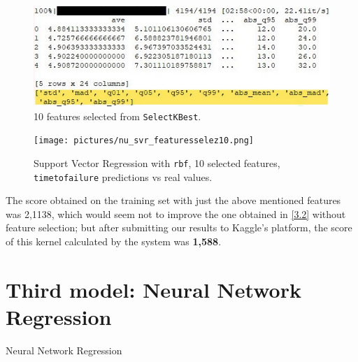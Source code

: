 \begin{figure} [h]
	\centering
	\includegraphics[width=1\linewidth]{pictures/featuresselez10_noroll.jpg}
	\caption{10 features selected from \texttt{SelectKBest}.}
	\label{fig:featsel}
\end{figure}


\begin{figure} [h]
	\centering
	\texttt{[image: pictures/nu\_svr\_featuresselez10.png]}
	\caption{Support Vector Regression with \texttt{rbf}, 10 selected features, \texttt{time\textunderscore to\textunderscore failure} predictions vs real values.}
	\label{fig:svrsel}
\end{figure}

The score obtained on the training set with just the above mentioned features was 2,1138, which would seem not to improve the one obtained in \ref{3.2} without feature selection; but after submitting our results to Kaggle's platform, the score of this kernel calculated by the system was \textbf{1,588}.

\section[Third model]{Third model: Neural Network Regression}
Neural Network Regression


